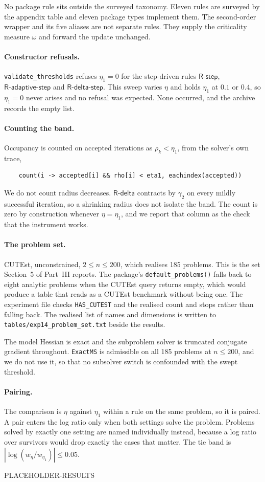 \documentclass[11pt,a4paper]{article}
\providecommand{\abs}[1]{\left \vert #1 \right \vert}
\providecommand{\Rdelta}{\textsf{R-delta}}
\providecommand{\Rstep}{\textsf{R-step}}
\providecommand{\RAdaptstep}{\textsf{R-adaptive-step}}
\providecommand{\Rdeltastep}{\textsf{R-delta-step}}
\providecommand{\gtwo}{\gamma_2}
\begin{document}
No package rule sits outside the surveyed taxonomy. Eleven rules are surveyed
by the appendix table and eleven package types implement them. The second-order
wrapper and its five aliases are not separate rules. They supply the criticality
measure $\omega$ and forward the update unchanged.

\paragraph{Constructor refusals.}
\texttt{validate\_thresholds} refuses $\eta_1 = 0$ for the step-driven rules
$\Rstep$, $\RAdaptstep$ and $\Rdeltastep$. This sweep varies $\eta$ and holds
$\eta_1$ at $0.1$ or $0.4$, so $\eta_1 = 0$ never arises and no refusal was
expected. None occurred, and the archive records the empty list.

\paragraph{Counting the band.}
Occupancy is counted on accepted iterations as $\rho_k < \eta_1$, from the
solver's own trace,
\begin{verbatim}
    count(i -> accepted[i] && rho[i] < eta1, eachindex(accepted))
\end{verbatim}
We do not count radius decreases. $\Rdelta$ contracts by $\gtwo$ on every mildly
successful iteration, so a shrinking radius does not isolate the band. The count
is zero by construction whenever $\eta = \eta_1$, and we report that column as
the check that the instrument works.

\paragraph{The problem set.}
CUTEst, unconstrained, $2 \leq n \leq 200$, which realises 185 problems. This is
the set Section~5 of Part~III reports. The package's \texttt{default\_problems()}
falls back to eight analytic problems when the CUTEst query returns empty, which
would produce a table that reads as a CUTEst benchmark without being one. The
experiment file checks \texttt{HAS\_CUTEST} and the realised count and stops
rather than falling back. The realised list of names and dimensions is written
to \texttt{tables/exp14\_problem\_set.txt} beside the results.

The model Hessian is exact and the subproblem solver is truncated conjugate
gradient throughout. \texttt{ExactMS} is admissible on all 185 problems at
$n \leq 200$, and we do not use it, so that no subsolver switch is confounded
with the swept threshold.

\paragraph{Pairing.}
The comparison is $\eta$ against $\eta_1$ within a rule on the same problem, so
it is paired. A pair enters the log ratio only when both settings solve the
problem. Problems solved by exactly one setting are named individually instead,
because a log ratio over survivors would drop exactly the cases that matter.
The tie band is $\abs{\log(w_\eta / w_{\eta_1})} \leq 0.05$.

PLACEHOLDER-RESULTS
\end{document}
